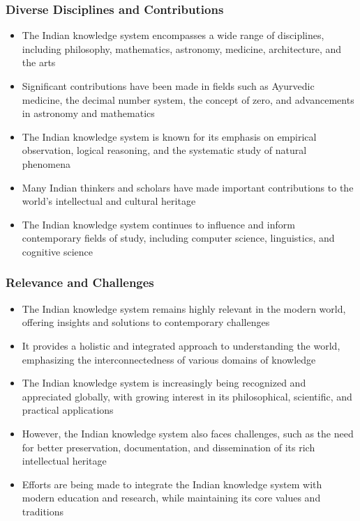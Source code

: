 \begin{frame}[fragile]\frametitle{Diverse Disciplines and Contributions}

\begin{itemize}
    \item The Indian knowledge system encompasses a wide range of disciplines, including philosophy, mathematics, astronomy, medicine, architecture, and the arts
    \item Significant contributions have been made in fields such as Ayurvedic medicine, the decimal number system, the concept of zero, and advancements in astronomy and mathematics
    \item The Indian knowledge system is known for its emphasis on empirical observation, logical reasoning, and the systematic study of natural phenomena
    \item Many Indian thinkers and scholars have made important contributions to the world's intellectual and cultural heritage
    \item The Indian knowledge system continues to influence and inform contemporary fields of study, including computer science, linguistics, and cognitive science
\end{itemize}

\end{frame}

\begin{frame}[fragile]\frametitle{Relevance and Challenges}

\begin{itemize}
    \item The Indian knowledge system remains highly relevant in the modern world, offering insights and solutions to contemporary challenges
    \item It provides a holistic and integrated approach to understanding the world, emphasizing the interconnectedness of various domains of knowledge
    \item The Indian knowledge system is increasingly being recognized and appreciated globally, with growing interest in its philosophical, scientific, and practical applications
    \item However, the Indian knowledge system also faces challenges, such as the need for better preservation, documentation, and dissemination of its rich intellectual heritage
    \item Efforts are being made to integrate the Indian knowledge system with modern education and research, while maintaining its core values and traditions
\end{itemize}

\end{frame}